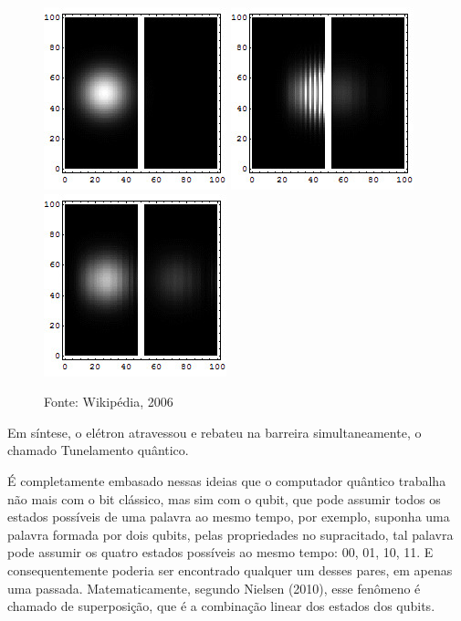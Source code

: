 \documentclass[
	12pt,				%
	oneside,			%
	a4paper,			%
	english,			%
	french,				%
	spanish,			%
	brazil,				%
	]{abntex2}
\begin{document}
\begin{figure}[h!]
	\centering
	\includegraphics[scale=1]{tunelj1.jpg}
	\includegraphics[scale=1]{tunelj2.jpg}
	\includegraphics[scale=1]{tunelj3.jpg}		
	\caption{Fonte: Wikipédia, 2006}
	\label{fig:tunel0}
\end{figure}

Em síntese, o elétron atravessou e rebateu na barreira simultaneamente, o chamado Tunelamento quântico.

É completamente embasado nessas ideias que o computador quântico trabalha não mais com o bit clássico, mas sim com o qubit, que pode assumir todos os estados possíveis de uma palavra ao mesmo tempo, por exemplo, suponha uma palavra formada por dois qubits, pelas propriedades no supracitado, tal palavra pode assumir os quatro estados possíveis ao mesmo tempo: 00, 01, 10, 11. E consequentemente poderia ser encontrado qualquer um desses pares, em apenas uma passada. Matematicamente, segundo \cite{nielsen:2010} Nielsen (2010), esse fenômeno é chamado de superposição, que é a combinação linear dos estados dos qubits.
\end{document}
